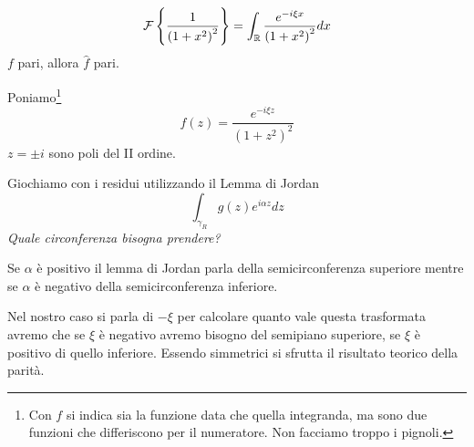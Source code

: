 \begin{equation*}
\mathcal{F} \left\{\frac{1}{\left( 1+x^{2}\right)^{2}}\right\} =\int _{\mathbb{R}}\frac{e^{-i\xi x}}{\left( 1+x^{2}\right)^{2}} dx
\end{equation*}
$f$ pari, allora $\hat{f}$ pari.

Poniamo\footnote{Con $f$ si indica sia la funzione data che quella integranda, ma sono due funzioni che differiscono per il numeratore. Non facciamo troppo i pignoli.}
\begin{equation*}
f( z) =\frac{e^{-i\xi z}}{\left( 1+z^{2}\right)^{2}}
\end{equation*}
$z=\pm i$ sono poli del II ordine.

Giochiamo con i residui utilizzando il Lemma di Jordan
\begin{equation*}
\int _{\gamma _{R}} g( z) e^{i\alpha z} dz
\end{equation*}
\textit{Quale circonferenza bisogna prendere?}

Se $\alpha $ è positivo il lemma di Jordan parla della semicirconferenza superiore mentre se $\alpha $ è negativo della semicirconferenza inferiore.

Nel nostro caso si parla di $-\xi $ per calcolare quanto vale questa trasformata avremo che se $\xi $ è negativo avremo bisogno del semipiano superiore, se $\xi $ è positivo di quello inferiore. Essendo simmetrici si sfrutta il risultato teorico della parità.


